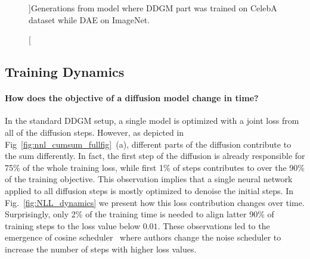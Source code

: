 \begin{figure}[htbp!]
	\centering
		\caption[][\baselineskip]{Generations from \ours{} model where DDGM part was trained on CelebA dataset while DAE on ImageNet.}
	\label{fig:celeba_gen_im} 
\vspace*{\baselineskip}
\end{figure}

\newpage
\subsection{Training Dynamics}\label{appx:train_curve}

\paragraph{How does the objective of a diffusion model change in time?}
In the standard DDGM setup, a single model is optimized with a joint loss from all of the diffusion steps. However, as depicted in Fig~\ref{fig:nnl_cumsum_fullfig}~(a), different parts of the diffusion contribute to the sum differently. In fact, the first step of the diffusion is already responsible for 75\% of the whole training loss, while first 1\% of steps contributes to over the 90\% of the training objective. This observation implies that a single neural network applied to all diffusion steps %
is mostly optimized to denoise the initial steps. 
In Fig.~\ref{fig:NLL_dynamics} we present how this loss contribution changes over time. Surprisingly, only 2\% of the training time is needed to align latter 90\% of training steps to the loss value below $0.01$. These observations led to the emergence of cosine scheduler~\cite{nichol2021improved} where authors change the noise scheduler to increase the number of steps with higher loss values.

